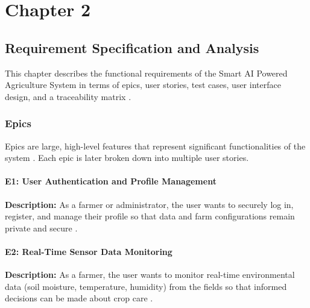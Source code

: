 
\setcounter{chapter}{2}
\setcounter{figure}{0}
\setcounter{table}{0}
\chapter*{Chapter 2}
\section{Requirement Specification and Analysis}

This chapter describes the functional requirements of the Smart AI 
Powered Agriculture System in terms of epics, user stories, test 
cases, user interface design, and a traceability matrix 
\cite{sommerville2016software}.

\subsection{Epics}

Epics are large, high-level features that represent significant 
functionalities of the system \cite{ferreira2022userstories}. Each 
epic is later broken down into multiple user stories.

\subsubsection{E1: User Authentication and Profile Management}

\textbf{Description:} As a farmer or administrator, the user wants 
to securely log in, register, and manage their profile so that data 
and farm configurations remain private and secure \cite{jwtmqtt2019}.

\subsubsection{E2: Real-Time Sensor Data Monitoring}

\textbf{Description:} As a farmer, the user wants to monitor 
real-time environmental data (soil moisture, temperature, humidity) 
from the fields so that informed decisions can be made about crop 
care \cite{ncbi2023iot}.

